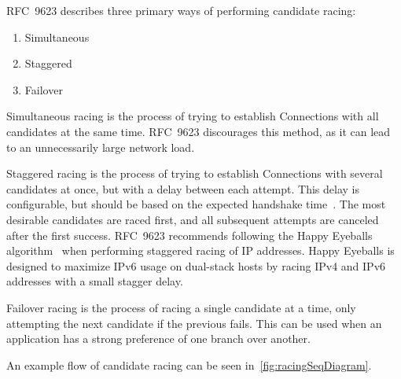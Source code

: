 RFC~9623 describes three primary ways of performing candidate
racing:

\begin{enumerate}
    \item Simultaneous
    \item Staggered
    \item Failover
\end{enumerate}

Simultaneous racing is the process of trying to establish
Connections with all candidates at the same time. RFC~9623
discourages this method, as it can lead to an unnecessarily large
network load.

Staggered racing is the process of trying to establish Connections
with several candidates at once, but with a delay between each attempt.
This delay is configurable, but should be based
on the expected handshake time~\cite[sec.~4.3.2]{rfc9623}. 
The most desirable candidates are raced first, and all subsequent
attempts are canceled after the first success.
RFC~9623 recommends following the Happy Eyeballs algorithm~\cite{rfc8305}
when performing staggered racing of IP addresses. Happy Eyeballs is designed
to maximize IPv6 usage on dual-stack hosts by racing IPv4 and IPv6 addresses
with a small stagger delay.

Failover racing is the process of racing a single candidate
at a time, only attempting the next candidate if the previous
fails. This can be used when an application has a strong preference
of one branch over another.

An example flow of candidate racing can be seen in~\cref{fig:racingSeqDiagram}.

